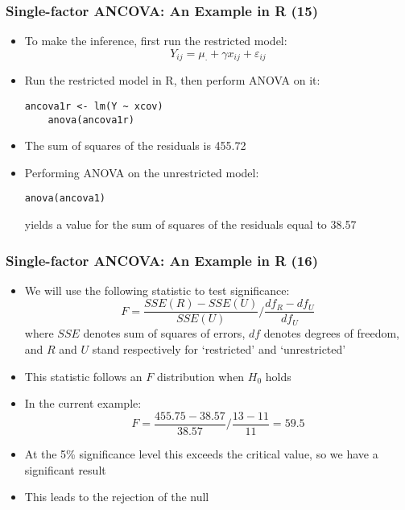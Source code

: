 \documentclass[10pt]{beamer}
\theoremstyle{definition}
\begin{document}
\begin{frame}[fragile]
\frametitle{Single-factor ANCOVA: An Example in R (15)}
\begin{itemize}
	\item To make the inference, first run the restricted model:
	\[
		Y_{ij} = \mu_{\cdot} + \gamma x_{ij} + \varepsilon_{ij}
	\]
	\item Run the restricted model in R, then perform ANOVA on it:
	\begin{lstlisting}[style = rstyle, breaklines] 
	ancova1r <- lm(Y ~ xcov)
	anova(ancova1r)		
	\end{lstlisting}
	\item The sum of squares of the residuals is 455.72
	\item Performing ANOVA on the unrestricted model:
	\begin{lstlisting}[style = rstyle, breaklines] 
	anova(ancova1)
	\end{lstlisting}
	yields a value for the sum of squares of the residuals equal to 38.57
\end{itemize}
\end{frame}

\begin{frame}[fragile]
\frametitle{Single-factor ANCOVA: An Example in R (16)}
\begin{itemize}
	\item We will use the following statistic to test significance:
	\[
		F = \frac{SSE(R) - SSE(U)}{SSE(U)}/\frac{df_{R} - df_{U}}{df_{U}}
	\]
	where $SSE$ denotes sum of squares of errors, $df$ denotes degrees of freedom, and $R$ and $U$ stand respectively for `restricted' and `unrestricted'
	\item This statistic follows an $F$ distribution when $H_{0}$ holds
	\item In the current example:
	\[
		F = \frac{455.75 - 38.57}{38.57}/\frac{13 - 11}{11} = 59.5
	\]
	\item At the 5\% significance level this exceeds the critical value, so we have a significant result
	\item This leads to the rejection of the null
\end{itemize}
\end{frame}
\end{document}
